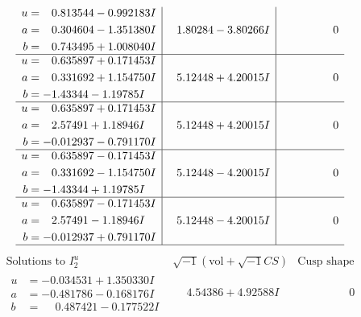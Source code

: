 \documentclass[1p]{elsarticle_modified}
\theoremstyle{definition}
\newcommand{\I}{\sqrt{-1}}
\begin{document}
$$\begin{array}{c|c|c}
\begin{aligned}
u &= \phantom{-}0.813544 - 0.992183 I \\
a &= \phantom{-}0.304604 - 1.351380 I \\
b &= \phantom{-}0.743495 + 1.008040 I\end{aligned}
 & \phantom{-}1.80284 - 3.80266 I & \phantom{-0.000000 } 0 \\ \hline\begin{aligned}
u &= \phantom{-}0.635897 + 0.171453 I \\
a &= \phantom{-}0.331692 + 1.154750 I \\
b &= -1.43344 - 1.19785 I\end{aligned}
 & \phantom{-}5.12448 + 4.20015 I & \phantom{-0.000000 } 0 \\ \hline\begin{aligned}
u &= \phantom{-}0.635897 + 0.171453 I \\
a &= \phantom{-}2.57491 + 1.18946 I \\
b &= -0.012937 - 0.791170 I\end{aligned}
 & \phantom{-}5.12448 + 4.20015 I & \phantom{-0.000000 } 0 \\ \hline\begin{aligned}
u &= \phantom{-}0.635897 - 0.171453 I \\
a &= \phantom{-}0.331692 - 1.154750 I \\
b &= -1.43344 + 1.19785 I\end{aligned}
 & \phantom{-}5.12448 - 4.20015 I & \phantom{-0.000000 } 0 \\ \hline\begin{aligned}
u &= \phantom{-}0.635897 - 0.171453 I \\
a &= \phantom{-}2.57491 - 1.18946 I \\
b &= -0.012937 + 0.791170 I\end{aligned}
 & \phantom{-}5.12448 - 4.20015 I & \phantom{-0.000000 } 0\\
 \hline 
 \end{array}$$\newpage$$\begin{array}{c|c|c}  
\text{Solutions to }I^u_{2}& \I (\text{vol} + \sqrt{-1}CS) & \text{Cusp shape}\\
 \hline 
\begin{aligned}
u &= -0.034531 + 1.350330 I \\
a &= -0.481786 - 0.168176 I \\
b &= \phantom{-}0.487421 - 0.177522 I\end{aligned}
 & \phantom{-}4.54386 + 4.92588 I & \phantom{-0.000000 } 0 \\ \hline\begin{aligned}

\end{aligned}
\end{array}$$
\end{document}
